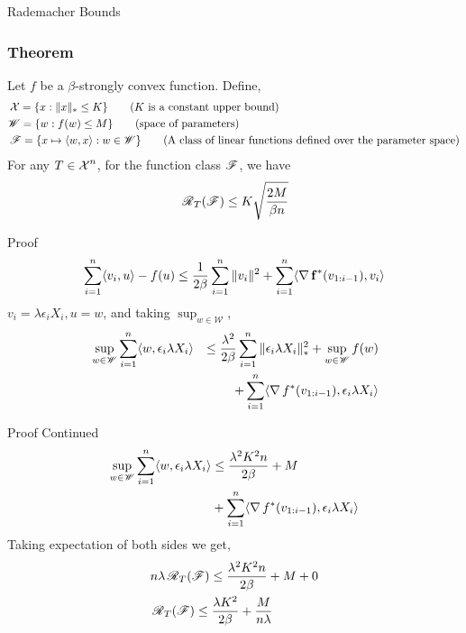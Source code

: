 \begin{frame}{Rademacher Bounds}
    \frametitle{Theorem}
    Let $f$ be a $\beta$-strongly convex function. Define,
    \begin{align*}
      & \operatorname{\mathcal{X}} = \{ x : \|x\|_{*} \le K \} \tag{$K$ is a constant upper bound}\\
      & \mathscr{W} = \{w : f(w) \le M\} \tag{space of parameters}\\
      & \operatorname{\mathscr{F}} = \{ x \mapsto \langle {w} , {x} \rangle : w \in \mathscr{W} \} \tag{A class of linear functions defined over the parameter space}
    \end{align*}
    For any $T \in \operatorname{\mathcal{X}}^n$, for the function class $\operatorname{\mathscr{F}}$, we have
    \begin{align*}
      & \operatorname{\mathscr{R}}_T(\operatorname{\mathscr{F}}) \le K\sqrt{\frac{2M}{\beta n}} \\
    \end{align*}
\end{frame}

\begin{frame}{Proof}
    \begin{align*}
      \sum_{i=1}^n \langle {v_i} , {u} \rangle - f(u) \le \frac{1}{2\beta} \sum_{i=1}^n \|v_i\|^2 + \sum_{i=1}^n \langle {\operatorname{\nabla}{\operatorname{\mathbf{f}}}^{*}(v_{1:i-1})} , {v_i} \rangle
    \end{align*}
    $v_i=\lambda\epsilon_i X_i,u=w$, and taking $\sup_{w \in \mathscr{W}}$,
    \begin{alignat*}{2}
      & \sup_{w \in \mathscr{W}} \sum_{i=1}^n \langle {w} , {\epsilon_i \lambda X_i} \rangle & \le \frac{\lambda^2}{2\beta}\sum_{i=1}^n \|\epsilon_i \lambda X_i\|_{*}^2 + \sup_{w \in \mathscr{W}} f(w) \\
      & & + \sum_{i=1}^n \langle {\operatorname{\nabla}{f}^{*}(v_{1:i-1})} , {\epsilon_i \lambda X_i} \rangle
    \end{alignat*}
\end{frame}

\begin{frame}{Proof Continued}
    \begin{align*}
      \sup_{w \in \mathscr{W}} \sum_{i=1}^n \langle {w} , {\epsilon_i \lambda X_i} \rangle & \le \frac{\lambda^2 K^2 n}{2\beta} + M \\
      & + \sum_{i=1}^n \langle {\operatorname{\nabla}{f}^{*}(v_{1:i-1})} , {\epsilon_i \lambda X_i} \rangle
    \end{align*}
    Taking expectation of both sides we get,
    \begin{align*}
      & n\lambda\operatorname{\mathscr{R}}_T(\operatorname{\mathscr{F}}) \le \frac{\lambda^2 K^2 n}{2\beta} + M + 0\\
      & \operatorname{\mathscr{R}}_T(\operatorname{\mathscr{F}}) \le \frac{\lambda K^2}{2\beta} + \frac{M}{n\lambda}
    \end{align*}
\end{frame}
